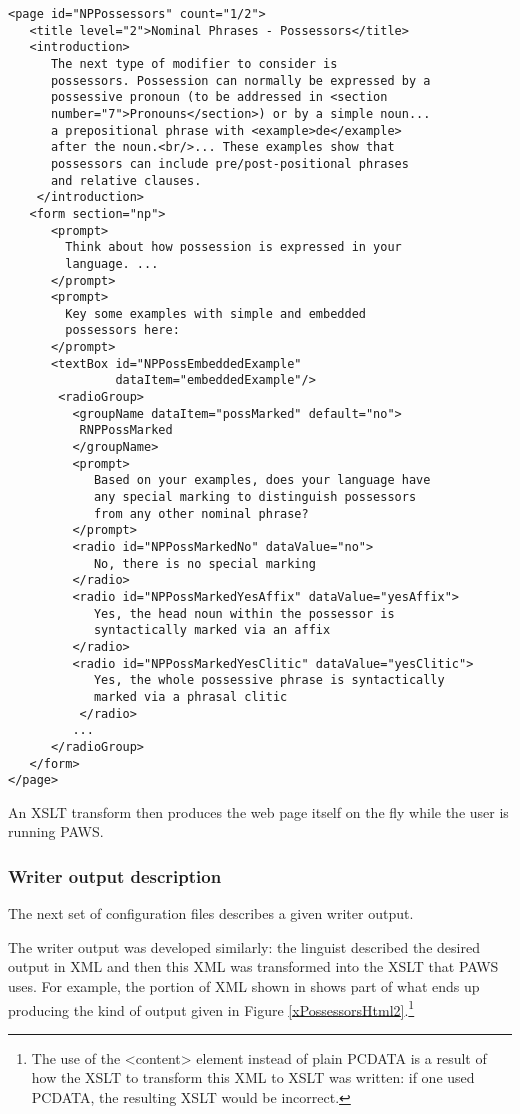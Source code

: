 \ea  \label{xSamplePageDescription}%
\begin{verbatim}
<page id="NPPossessors" count="1/2">
   <title level="2">Nominal Phrases - Possessors</title>
   <introduction> 
      The next type of modifier to consider is 
      possessors. Possession can normally be expressed by a
      possessive pronoun (to be addressed in <section 
      number="7">Pronouns</section>) or by a simple noun... 
      a prepositional phrase with <example>de</example> 
      after the noun.<br/>... These examples show that 
      possessors can include pre/post-positional phrases 
      and relative clauses. 
    </introduction>
   <form section="np">
      <prompt>
        Think about how possession is expressed in your
        language. ...
      </prompt>
      <prompt> 
        Key some examples with simple and embedded 
        possessors here:
      </prompt>
      <textBox id="NPPossEmbeddedExample"
               dataItem="embeddedExample"/> 
       <radioGroup>
         <groupName dataItem="possMarked" default="no">
          RNPPossMarked
         </groupName>
         <prompt>
            Based on your examples, does your language have 
            any special marking to distinguish possessors 
            from any other nominal phrase?
         </prompt>
         <radio id="NPPossMarkedNo" dataValue="no">
            No, there is no special marking
         </radio>
         <radio id="NPPossMarkedYesAffix" dataValue="yesAffix">
            Yes, the head noun within the possessor is 
            syntactically marked via an affix
         </radio>
         <radio id="NPPossMarkedYesClitic" dataValue="yesClitic">
            Yes, the whole possessive phrase is syntactically 
            marked via a phrasal clitic
          </radio>
         ...
      </radioGroup>
   </form>
</page>

\end{verbatim}
\z

An XSLT transform then produces the web page itself on the fly while the user is running {PAWS}.

\subsubsection{Writer output description} \label{sConfigWriterOutput}
  
The next set of configuration files describes a given writer output.

The writer output was developed similarly: the linguist described the desired output in XML and then this XML was transformed into the XSLT that {PAWS} uses. For example, the portion of XML shown in  shows part of what ends up producing the kind of output given in Figure \ref{xPossessorsHtml2}.\footnote{\label{nContentElement}
   The use of the <content> element instead of plain PCDATA is a result of how the XSLT to transform this XML to XSLT was written: if one used PCDATA, the resulting XSLT would be incorrect.
}

